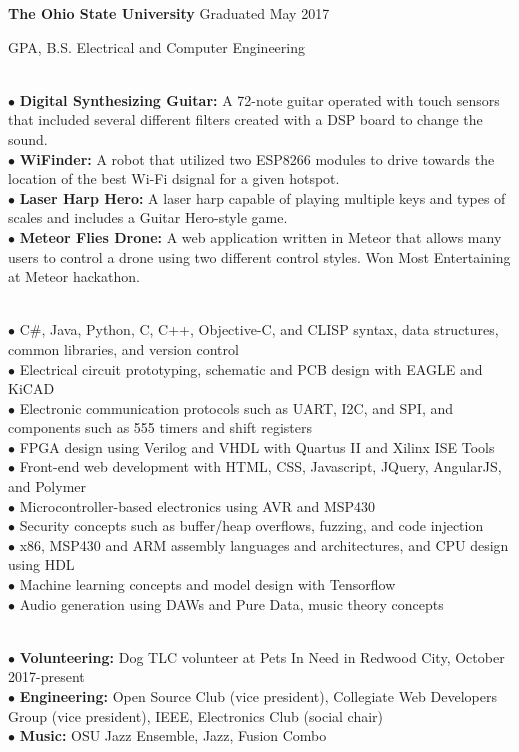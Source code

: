 \documentclass[10pt]{article}
\begin{document}
\centerline{{\large {\bf The Ohio State University} \hfill Graduated May 2017}}
 GPA, B.S. Electrical and Computer Engineering
\medskip

\\
$\bullet$ {\bf Digital Synthesizing Guitar:} A 72-note guitar operated with touch sensors that included several different filters created with a DSP board to change the sound.\\
$\bullet$ {\bf WiFinder:} A robot that utilized two ESP8266 modules to drive towards the location of the best Wi-Fi dsignal for a given hotspot.\\
$\bullet$ {\bf Laser Harp Hero:} A laser harp capable of playing multiple keys and types of scales and includes a Guitar Hero-style game.\\
$\bullet$ {\bf Meteor Flies Drone:} A web application written in Meteor that allows many users to control a drone using two different control styles. Won Most Entertaining at Meteor hackathon.\\
\medskip

\\
$\bullet$ C\#, Java, Python, C, C++, Objective-C, and CLISP syntax, data structures, common libraries, and version control\\
$\bullet$ Electrical circuit prototyping, schematic and PCB design with EAGLE and KiCAD\\
$\bullet$ Electronic communication protocols such as UART, I2C, and SPI, and components such as 555 timers and shift registers\\
$\bullet$ FPGA design using Verilog and VHDL with Quartus II and Xilinx ISE Tools\\
$\bullet$ Front-end web development with HTML, CSS, Javascript, JQuery, AngularJS, and Polymer\\
$\bullet$ Microcontroller-based electronics using AVR and MSP430\\
$\bullet$ Security concepts such as buffer/heap overflows, fuzzing, and code injection\\
$\bullet$ x86, MSP430 and ARM assembly languages and architectures, and CPU design using HDL\\
$\bullet$ Machine learning concepts and model design with Tensorflow\\
$\bullet$ Audio generation using DAWs and Pure Data, music theory concepts\\
\medskip

\\
$\bullet$ {\bf Volunteering:} Dog TLC volunteer at Pets In Need in Redwood City, October 2017-present\\
$\bullet$ {\bf Engineering:} Open Source Club (vice president), Collegiate Web Developers Group (vice president), IEEE, Electronics Club (social chair)\\
$\bullet$ {\bf Music:} OSU Jazz Ensemble, Jazz, Fusion Combo\\
\medskip
\end{document}
